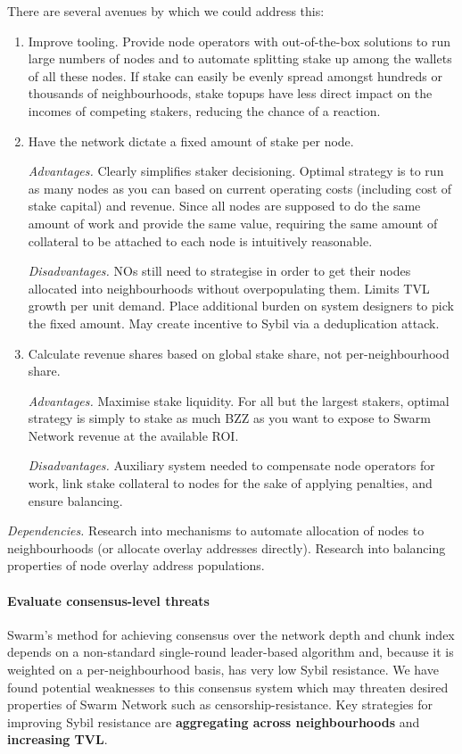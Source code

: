 There are several avenues by which we could address this:
%
\begin{enumerate}
  \item Improve tooling.
  Provide node operators with out-of-the-box solutions to run large numbers of nodes and to automate splitting stake up among the wallets of all these nodes.
  If stake can easily be evenly spread amongst hundreds or thousands of neighbourhoods, stake topups have less direct impact on the incomes of competing stakers, reducing the chance of a reaction.

  \item Have the network dictate a fixed amount of stake per node.

  \emph{Advantages.} Clearly simplifies staker decisioning. Optimal strategy is to run as many nodes as you can based on current operating costs (including cost of stake capital) and revenue. Since all nodes are supposed to do the same amount of work and provide the same value, requiring the same amount of collateral to be attached to each node is intuitively reasonable.

  \emph{Disadvantages.} NOs still need to strategise in order to get their nodes allocated into neighbourhoods without overpopulating them. Limits TVL growth per unit demand. Place additional burden on system designers to pick the fixed amount. May create incentive to Sybil via a deduplication attack.

  \item Calculate revenue shares based on global stake share, not per-neighbourhood share.

  \emph{Advantages.} Maximise stake liquidity. For all but the largest stakers, optimal strategy is simply to stake as much BZZ as you want to expose to Swarm Network revenue at the available ROI.

  \emph{Disadvantages.} Auxiliary system needed to compensate node operators for work, link stake collateral to nodes for the sake of applying penalties, and ensure balancing.
\end{enumerate}

\emph{Dependencies.}
%
Research into mechanisms to automate allocation of nodes to neighbourhoods (or allocate overlay addresses directly).
%
Research into balancing properties of node overlay address populations.


\paragraph{Evaluate consensus-level threats}
%
Swarm's method for achieving consensus over the network depth and chunk index depends on a non-standard single-round leader-based algorithm and, because it is weighted on a per-neighbourhood basis, has very low Sybil resistance.
%
We have found potential weaknesses to this consensus system which may threaten desired properties of Swarm Network such as censorship-resistance.
%
Key strategies for improving Sybil resistance are \textbf{aggregating across neighbourhoods} and \textbf{increasing TVL}.
